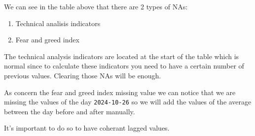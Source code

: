 \documentclass[
]{article}
\newenvironment{Shaded}{\begin{snugshade}}{\end{snugshade}}
\newcommand{\AttributeTok}[1]{\textcolor[rgb]{0.13,0.29,0.53}{#1}}
\newcommand{\FunctionTok}[1]{\textcolor[rgb]{0.13,0.29,0.53}{\textbf{#1}}}
\newcommand{\NormalTok}[1]{#1}
\newcommand{\OtherTok}[1]{\textcolor[rgb]{0.56,0.35,0.01}{#1}}
\newcommand{\SpecialCharTok}[1]{\textcolor[rgb]{0.81,0.36,0.00}{\textbf{#1}}}
\newcommand{\StringTok}[1]{\textcolor[rgb]{0.31,0.60,0.02}{#1}}
\begin{document}
We can see in the table above that there are 2 types of NAs:

\begin{enumerate}
\def\labelenumi{\arabic{enumi}.}
\item
  Technical analisis indicators
\item
  Fear and greed index
\end{enumerate}

The technical analysis indicators are located at the start of the table
which is normal since to calculate these indicators you need to have a
certain number of previous values. Clearing those NAs will be enough.

As concern the fear and greed index missing value we can notice that we
are missing the values of the day \texttt{2024-10-26} so we will add the
values of the average between the day before and after manually.

It's important to do so to have coherant lagged values.

\begin{Shaded}
\end{Shaded}
\end{document}
